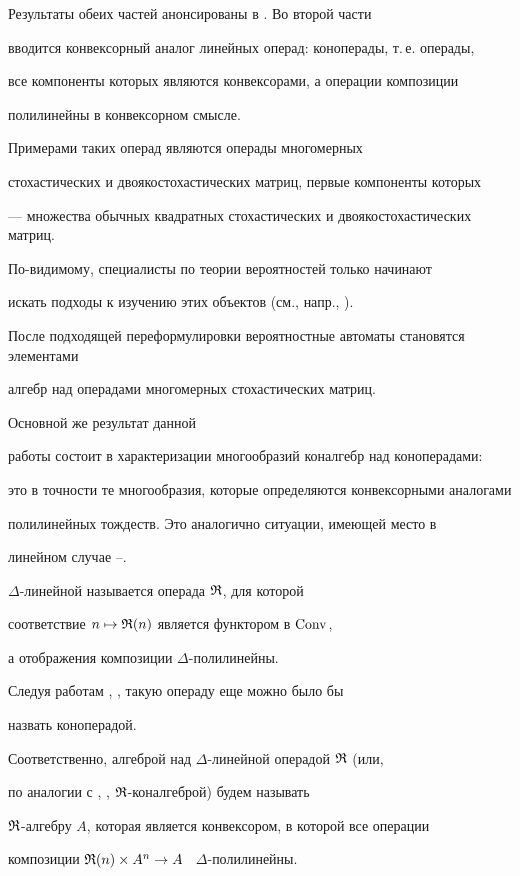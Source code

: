 Результаты обеих частей анонсированы в \cite{T4}. Во второй части 


вводится конвексорный аналог линейных операд: коноперады, т.\,е. операды,


все компоненты которых являются конвексорами, а операции композиции


полилинейны в конвексорном смысле.


Примерами таких операд являются операды многомерных


стохастических и двоякостохастических матриц, первые компоненты которых


--- множества обычных квадратных стохастических и двоякостохастических матриц.


По-видимому, специалисты по теории вероятностей только начинают


искать подходы к изучению этих объектов (см., напр., \cite{Max}).


После подходящей переформулировки вероятностные автоматы становятся элементами


алгебр над операдами многомерных стохастических матриц. 


Основной же результат данной


работы состоит в характеризации многообразий коналгебр над коноперадами:


это в точности те многообразия, которые определяются конвексорными аналогами


полилинейных тождеств. Это аналогично ситуации, имеющей место в


линейном случае \cite{T1}--\cite{T}.








$\Delta$-линейной называется операда $\frak R$, для которой


соответствие $n\mapsto \frak R(n)$ является функтором в $\operatorname{Conv}$,


а отображения композиции $\Delta$-полилинейны.


Следуя работам \cite{Sc1}, \cite{Sc2}, такую операду еще можно было бы


назвать коноперадой.


Соответственно, алгеброй над $\Delta$-линейной операдой $\frak R$ (или,


по аналогии с \cite{Sc1}, \cite{Sc2}, $\frak R$-коналгеброй) будем называть


$\frak R$-алгебру $A$, которая является конвексором, в которой все операции


композиции $\frak R(n)\times A^n\to A$ \ $\Delta$-полилинейны.


